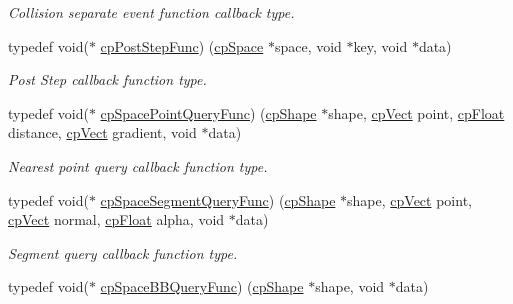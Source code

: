 \begin{DoxyCompactItemize}
\begin{DoxyCompactList}\small\item\em Collision separate event function callback type. \end{DoxyCompactList}\item 
\hypertarget{group__cp_space_ga93e9005e387fec86eeb4a225ac295a23}{}typedef void($\ast$ \hyperlink{group__cp_space_ga93e9005e387fec86eeb4a225ac295a23}{cp\+Post\+Step\+Func}) (\hyperlink{structcp_space}{cp\+Space} $\ast$space, void $\ast$key, void $\ast$data)\label{group__cp_space_ga93e9005e387fec86eeb4a225ac295a23}

\begin{DoxyCompactList}\small\item\em Post Step callback function type. \end{DoxyCompactList}\item 
\hypertarget{group__cp_space_ga646a55f0937f07c19b24561ed5341221}{}typedef void($\ast$ \hyperlink{group__cp_space_ga646a55f0937f07c19b24561ed5341221}{cp\+Space\+Point\+Query\+Func}) (\hyperlink{structcp_shape}{cp\+Shape} $\ast$shape, \hyperlink{structcp_vect}{cp\+Vect} point, \hyperlink{group__basic_types_gac1ed65573e035bf892505768c852d8d3}{cp\+Float} distance, \hyperlink{structcp_vect}{cp\+Vect} gradient, void $\ast$data)\label{group__cp_space_ga646a55f0937f07c19b24561ed5341221}

\begin{DoxyCompactList}\small\item\em Nearest point query callback function type. \end{DoxyCompactList}\item 
\hypertarget{group__cp_space_ga9046beaeba5728c5e954f0f1dc2ae130}{}typedef void($\ast$ \hyperlink{group__cp_space_ga9046beaeba5728c5e954f0f1dc2ae130}{cp\+Space\+Segment\+Query\+Func}) (\hyperlink{structcp_shape}{cp\+Shape} $\ast$shape, \hyperlink{structcp_vect}{cp\+Vect} point, \hyperlink{structcp_vect}{cp\+Vect} normal, \hyperlink{group__basic_types_gac1ed65573e035bf892505768c852d8d3}{cp\+Float} alpha, void $\ast$data)\label{group__cp_space_ga9046beaeba5728c5e954f0f1dc2ae130}

\begin{DoxyCompactList}\small\item\em Segment query callback function type. \end{DoxyCompactList}\item 
\hypertarget{group__cp_space_ga02779238e9b8c07797aae6139fad203c}{}typedef void($\ast$ \hyperlink{group__cp_space_ga02779238e9b8c07797aae6139fad203c}{cp\+Space\+B\+B\+Query\+Func}) (\hyperlink{structcp_shape}{cp\+Shape} $\ast$shape, void $\ast$data)\label{group__cp_space_ga02779238e9b8c07797aae6139fad203c}


\end{DoxyCompactItemize}
